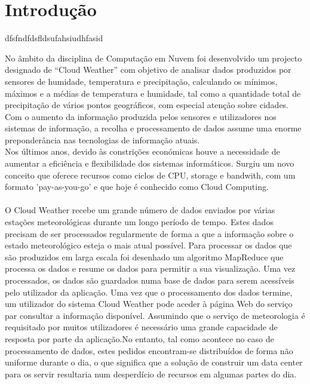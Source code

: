 
\chapter{Introdução} %

\label{Chapter1} %



dfsfndfdsfldsufahsiudhfasid

No âmbito da disciplina de Computação em Nuvem foi desenvolvido um projecto designado de “Cloud Weather” com objetivo de analisar dados produzidos por sensores de humidade, temperatura e precipitação, calculando os mínimos, máximos e a médias de temperatura e humidade, tal como a quantidade total de precipitação de vários pontos geográficos, com especial atenção sobre cidades.\\
Com o aumento da informação produzida pelos sensores e utilizadores nos sistemas de informação, a recolha e processamento de dados assume uma enorme preponderância nas tecnologias de informação atuais. \\
Nos últimos anos, devido às constrições económicas houve a necessidade de aumentar a eficiência e flexibilidade dos sistemas informáticos. Surgiu um novo conceito que oferece recursos como ciclos de CPU, storage e bandwith, com um formato 'pay-as-you-go' e que hoje é conhecido como Cloud Computing.\\
\\
O Cloud Weather recebe um grande número de dados enviados por várias estações meteorológicas durante um longo período de tempo. Estes dados precisam de ser processados regularmente de forma a que a informação sobre o estado meteorológico esteja o mais atual possível. Para processar os dados que são produzidos em larga escala foi desenhado um algoritmo MapReduce que  processa os dados e resume os dados para permitir a sua visualização. Uma vez processados, os dados são guardados numa base de dados para serem acessíveis pelo utilizador da aplicação. Uma vez que o processamento dos dados termine, um utilizador do sistema Cloud Weather pode aceder à página Web do serviço par consultar a informação disponível. Assumindo que o serviço de meteorologia é requisitado por muitos utilizadores é necessário uma grande capacidade de resposta por parte da aplicação.No entanto, tal como acontece no caso de processamento de dados, estes pedidos encontram-se distribuídos de forma não uniforme durante o dia, o que significa que a solução de construir um data center para os servir resultaria num desperdício de recursos em algumas partes do dia.\\ 
